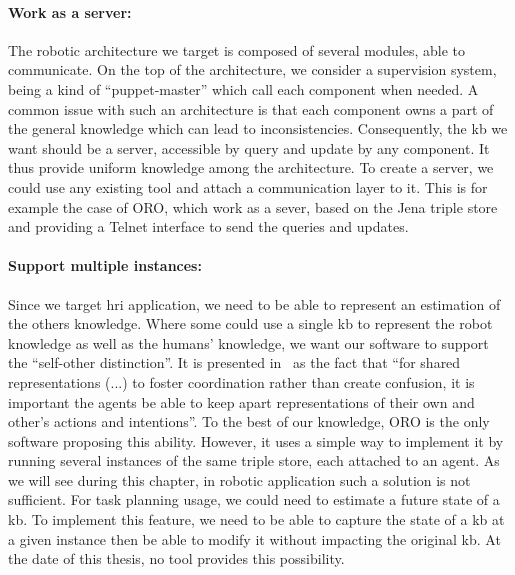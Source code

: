 \paragraph{Work as a server:} The robotic architecture we target is composed of several modules, able to communicate. On the top of the architecture, we consider a supervision system, being a kind of ``puppet-master'' which call each component when needed. A common issue with such an architecture is that each component owns a part of the general knowledge which can lead to inconsistencies. Consequently, the \acrlong{kb} we want should be a server, accessible by query and update by any component. It thus provide uniform knowledge among the architecture. To create a server, we could use any existing tool and attach a communication layer to it. This is for example the case of ORO, which work as a sever, based on the Jena triple store and providing a Telnet interface to send the queries and updates.

\paragraph{Support multiple instances:} Since we target \acrshort{hri} application, we need to be able to represent an estimation of the others knowledge. Where some could use a single \acrlong{kb} to represent the robot knowledge as well as the humans' knowledge, we want our software to support the ``self-other distinction''. It is presented in~\cite{pacherie_2012_phenomenology} as the fact that ``for shared representations (...) to foster coordination rather than create confusion, it is important the agents be able to keep apart representations of their own and other's actions and intentions''. To the best of our knowledge, ORO is the only software proposing this ability. However, it uses a simple way to implement it by running several instances of the same triple store, each attached to an agent. As we will see during this chapter, in robotic application such a solution is not sufficient. For task planning usage, we could need to estimate a future state of a \acrshort{kb}. To implement this feature, we need to be able to capture the state of a \acrshort{kb} at a given instance then be able to modify it without impacting the original \acrshort{kb}. At the date of this thesis, no tool provides this possibility.

